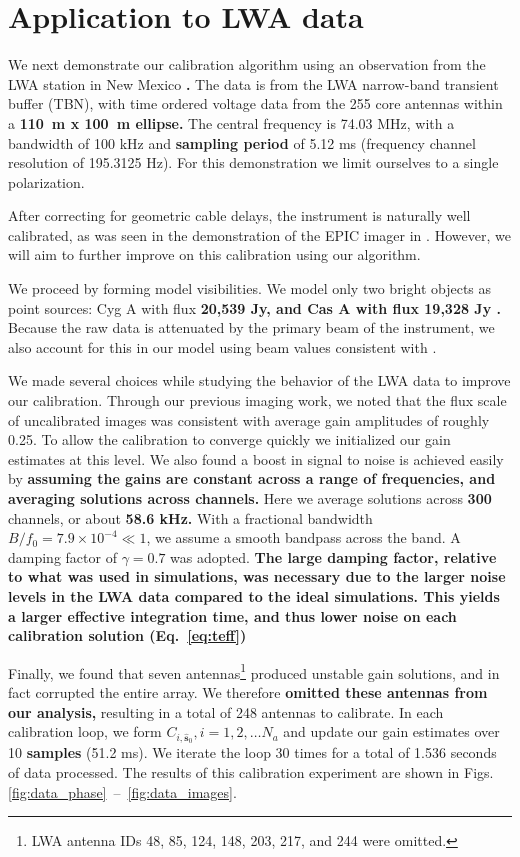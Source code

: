 \documentclass[a4paper,fleqn,usenatbib]{../mnras}
\begin{document}
\section{Application to LWA data}\label{sec:data}
We next demonstrate our calibration algorithm using an observation from the LWA station in 
New Mexico \textbf{\citep{ell13}.} The data is from the LWA narrow-band transient buffer (TBN), with time ordered 
voltage data from the 255 core antennas within a \textbf{110~m x 100~m ellipse. }
The central frequency is 74.03 
MHz, with a bandwidth of 100 kHz and \textbf{sampling period} of 5.12 ms (frequency channel 
resolution of 195.3125 Hz). For this demonstration we limit ourselves to a single polarization.

After correcting for geometric cable delays, the instrument is naturally well calibrated, as was 
seen in the demonstration of the EPIC imager in \citealt{thy15c}. However, we will aim to 
further improve on this calibration using our algorithm.

We proceed by forming model visibilities. We model only two bright objects as point sources: 
Cyg A with flux \textbf{20,539 Jy, and Cas A with flux 19,328 Jy \citep{lan12}. }
Because the raw data is attenuated by the primary beam of the instrument, we also account for 
this in our model using beam values consistent with \cite{hic12}.

We made several choices while studying the behavior of the LWA data to improve our 
calibration. Through our previous imaging work, we noted that the flux scale of uncalibrated 
images was consistent with average gain amplitudes of roughly 0.25. To allow the calibration to 
converge quickly we initialized our gain estimates at this level. 
We also found a boost in signal to noise is achieved easily by \textbf{assuming the gains are
constant across a range of frequencies, and averaging solutions across channels.}
Here we average solutions across \textbf{300} channels, or about \textbf{58.6 kHz.} 
With a fractional bandwidth $B/f_0 = 7.9 \times 10^{-4} \ll 1$, we assume a smooth bandpass 
across the band. 
A damping factor of $\gamma = 0.7$ was adopted.
\textbf{The large damping factor, relative to what was used in simulations, was necessary due to
the larger noise levels in the LWA data compared to the ideal simulations. This yields
a larger effective integration time, and thus lower noise on each calibration solution
(Eq.~\ref{eq:teff})}

Finally, we found that seven antennas\footnote{LWA antenna IDs 48, 85, 124, 148, 203, 217, 
and 244 were omitted.} produced unstable gain solutions, and in fact corrupted the entire array. 
We therefore \textbf{omitted these antennas from our analysis,} resulting in a total of 248 antennas to 
calibrate. In each calibration loop, we form $C_{i,\hat{\boldsymbol{s}}_0}, i=1,2,\ldots N_a$ and 
update our gain estimates over 10 \textbf{samples} (51.2 ms). We iterate the loop 30 times for a 
total of 1.536 seconds of data processed. The results of this calibration experiment are shown in Figs.~
\ref{fig:data_phase}~--~\ref{fig:data_images}.
\end{document}
